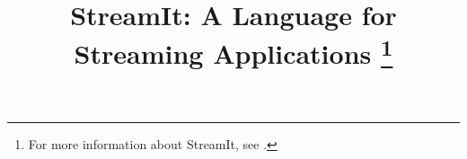 \documentclass[10pt,twocolumn]{article}
\begin{document}
\title{StreamIt: A Language for Streaming Applications%
\thanks{For more information about StreamIt, see \streamiturl.}}


\maketitle

\newcommand{\makeline}[0]{\rule{0cm}{0cm}\\\hrule\rule{0cm}{0cm}}


\thispagestyle{empty}

\begin{abstract}

\end{abstract}







%
%
%









%
\end{document}

